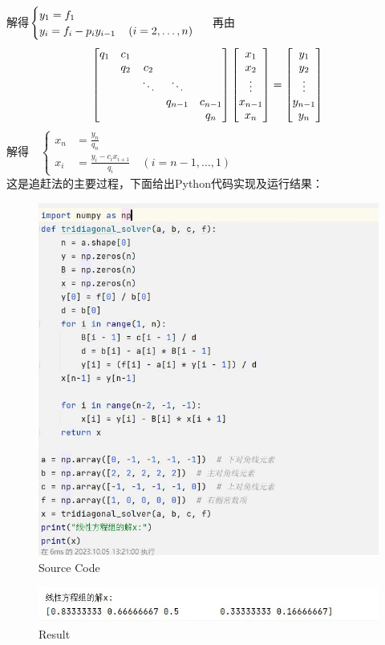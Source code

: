 \documentclass[a4paper,11pt,UTF8]{article}
\begin{document}
解得$\begin{cases}y_1=f_1\\y_i=f_i-p_iy_{i-1}\quad\left(i=2,\ldots,n\right)\end{cases}\\$
再由
$$
\begin{bmatrix}q_1&c_1&&&\\&q_2&c_2&&\\&&\ddots&\ddots&\\&&&q_{n-1}&c_{n-1}\\&&&&q_n\end{bmatrix}\begin{bmatrix}x_1\\x_2\\\vdots\\x_{n-1}\\x_n\end{bmatrix}=\begin{bmatrix}y_1\\y_2\\\vdots\\y_{n-1}\\y_n\end{bmatrix}\\
$$
解得$\quad\left\{\begin{aligned}x_n&=\frac{y_n}{q_n}\\x_i&=\frac{y_i-c_ix_{i+1}}{q_i}\quad(i=n-1,\ldots,1)\end{aligned}\right.$\\
这是追赶法的主要过程，下面给出Python代码实现及运行结果：
\begin{figure}[H] 
	\centering 
	\includegraphics[scale=0.7]{kx3.4.jpg}
	\caption{Source Code}
\end{figure}
\begin{figure}[H] 
	\centering 
	\includegraphics[scale=0.8]{kx3.4_1.jpg}
	\caption{Result}
\end{figure}
\end{document}
